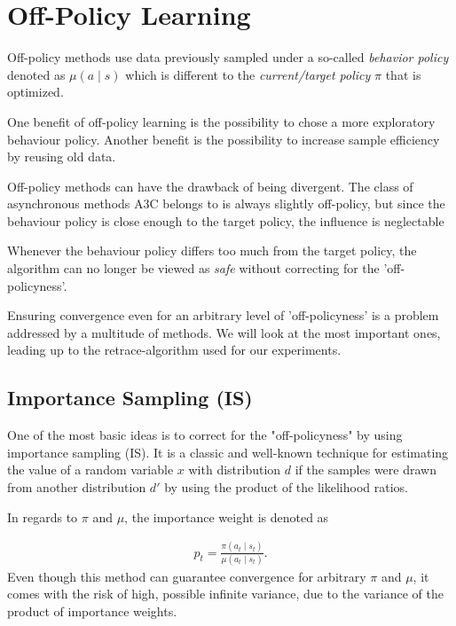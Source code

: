 \pagebreak
\section{Off-Policy Learning}
\raggedbottom 

Off-policy methods use data previously sampled under a so-called \textit{behavior policy} denoted as $\mu(a \mid s)$  which is different to the \textit{current/target policy}  $\pi$ that is optimized.

One benefit of off-policy learning is the possibility to chose a more exploratory behaviour policy. 
Another benefit is the possibility to increase sample efficiency by reusing old data.
\citep{Degris12}

Off-policy methods can have the drawback of being divergent.
The class of asynchronous methods A3C belongs to is always slightly off-policy, but since the behaviour policy is close enough to the target policy, the influence is neglectable

Whenever the behaviour policy differs too much from the target policy, the algorithm can no longer be viewed as \textit{safe} without correcting for the 'off-policyness'. \citep{Munos16}

Ensuring convergence even for an arbitrary level of 'off-policyness' is a problem addressed by a multitude of methods.
We will look at the most important ones, leading up to the retrace-algorithm used for our experiments.

\subsection{Importance Sampling (IS)}

One of the most basic ideas is to correct for the "off-policyness" by using importance sampling (IS).
It is a classic and well-known technique for estimating the value of a random variable $x$ with distribution $d$  if the samples were drawn from another distribution $d'$
by using the product of the likelihood ratios.

In regards to $\pi$ and $\mu$, the importance weight is denoted as

\begin{align}
{
p_t = \frac{\pi (a_t \mid s_t)}{\mu (a_t \mid s_t)}.
}
\label{IW}
\end{align}
Even though this method can guarantee convergence \citep{Munos16} for arbitrary $\pi$ and $\mu$, it comes with the risk of high, possible infinite  variance, due to the variance of the product of importance weights.

